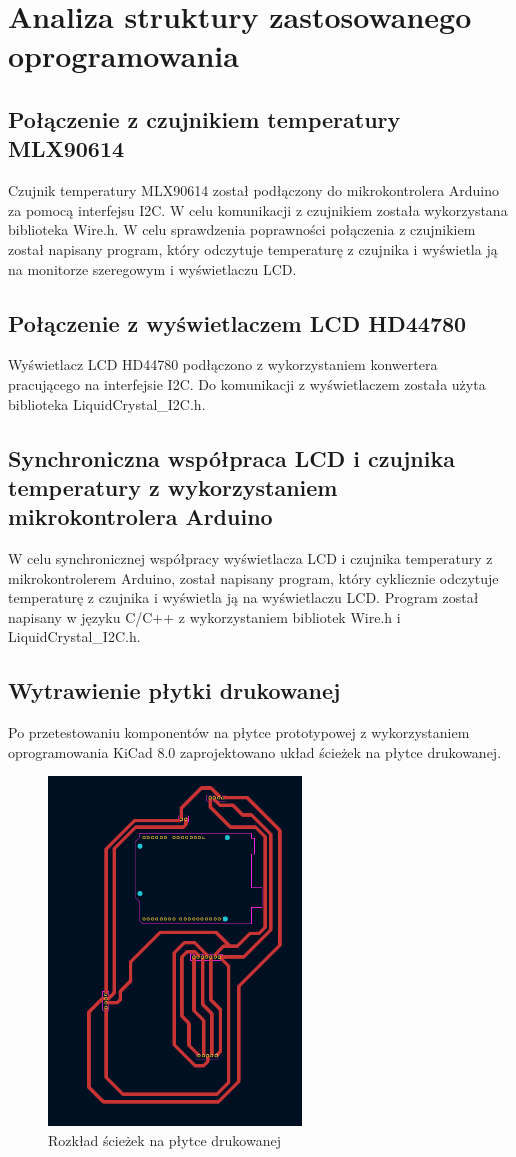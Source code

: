 \chapter{Analiza struktury zastosowanego oprogramowania}
\section{Połączenie z czujnikiem temperatury MLX90614}

Czujnik temperatury MLX90614 został podłączony do mikrokontrolera Arduino za pomocą interfejsu I2C. W celu komunikacji z czujnikiem została wykorzystana biblioteka Wire.h. W celu sprawdzenia poprawności połączenia z czujnikiem został napisany program, który odczytuje temperaturę z czujnika i wyświetla ją na monitorze szeregowym i wyświetlaczu LCD. 

\section{Połączenie z wyświetlaczem LCD HD44780}

Wyświetlacz LCD HD44780 podłączono z wykorzystaniem konwertera pracującego na interfejsie I2C. Do komunikacji z wyświetlaczem została użyta biblioteka LiquidCrystal\_I2C.h.

\section{Synchroniczna współpraca LCD i czujnika temperatury z wykorzystaniem mikrokontrolera Arduino}

W celu synchronicznej współpracy wyświetlacza LCD i czujnika temperatury z mikrokontrolerem Arduino, został napisany program, który cyklicznie odczytuje temperaturę z czujnika i wyświetla ją na wyświetlaczu LCD. Program został napisany w języku C/C++ z wykorzystaniem bibliotek Wire.h i LiquidCrystal\_I2C.h.

\section{Wytrawienie płytki drukowanej}

Po przetestowaniu komponentów na płytce prototypowej z wykorzystaniem oprogramowania KiCad 8.0 zaprojektowano układ ścieżek na płytce drukowanej.

\begin{figure}[h!]
    \centering
    \includegraphics[width=0.6\textwidth]{images/layout.png}
    \caption{Rozkład ścieżek na płytce drukowanej}
    \label{fig:twoj_obrazek}
\end{figure}